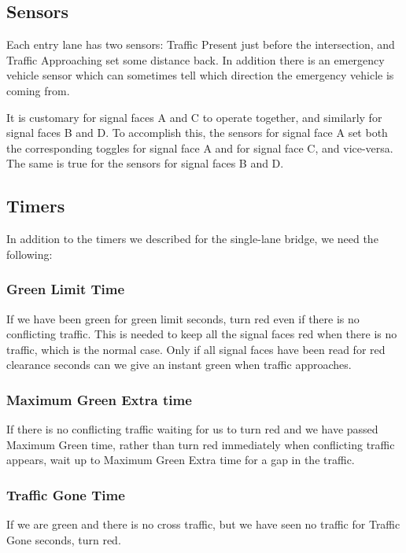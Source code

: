 \documentclass[letterpaper,twoside]{article}
\begin{document}
\subsection{Sensors}

Each entry lane has two sensors: Traffic Present just before the intersection,
and Traffic Approaching set some distance back.  In addition there is an
emergency vehicle sensor which can sometimes tell which direction
the emergency vehicle is coming from.

It is customary for signal faces A and C to operate together,
and similarly for signal faces B and D.  To accomplish this, the sensors for
signal face A set both the corresponding toggles for signal face A
and for signal face C, and vice-versa.  The same is true for the sensors
for signal faces B and D.

\subsection{Timers}

In addition to the timers we described for the single-lane bridge,
we need the following:

\subsubsection{Green Limit Time}

If we have been green for green limit seconds, turn red even if there
is no conflicting traffic.  This is needed to keep all the signal faces
red when there is no traffic, which is the normal case.  Only if all
signal faces have been read for red clearance seconds can we give
an instant green when traffic approaches.

\subsubsection{Maximum Green Extra time}

If there is no conflicting traffic waiting for us to turn red and we have
passed Maximum Green time, rather than turn red immediately when conflicting
traffic appears, wait up to Maximum Green Extra time for a gap in the traffic.

\subsubsection{Traffic Gone Time}
If we are green and there is no cross traffic, but we have seen no traffic
for Traffic Gone seconds, turn red.
\end{document}
